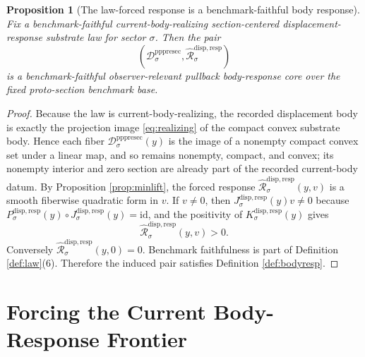 \documentclass[11pt]{article}
\newcommand{\PrePreProtoSectionResidualBody}[1]{\mathcal D_{#1}^{\mathrm{pppresec}}}
\newcommand{\SubstrateProjection}[1]{P_{#1}^{\mathrm{disp,resp}}}
\newcommand{\SubstrateOperator}[1]{K_{#1}^{\mathrm{disp,resp}}}
\newcommand{\SubstrateLift}[1]{J_{#1}^{\mathrm{disp,resp}}}
\newcommand{\ForcedBodyResponse}[1]{\widehat{\mathscr R}_{#1}^{\mathrm{disp,resp}}}
\newtheorem{proposition}{Proposition}
\begin{document}
\begin{proposition}[The law-forced response is a benchmark-faithful body response]
\label{prop:response}
Fix a benchmark-faithful current-body-realizing section-centered displacement-response substrate law for sector \(\sigma\). Then the pair
\[
\left(
\PrePreProtoSectionResidualBody{\sigma},
\ForcedBodyResponse{\sigma}
\right)
\]
is a benchmark-faithful observer-relevant pullback body-response core over the fixed proto-section benchmark base.
\end{proposition}

\begin{proof}
Because the law is current-body-realizing, the recorded displacement body is exactly the projection image \eqref{eq:realizing} of the compact convex substrate body. Hence each fiber \(\PrePreProtoSectionResidualBody{\sigma}(y)\) is the image of a nonempty compact convex set under a linear map, and so remains nonempty, compact, and convex; its nonempty interior and zero section are already part of the recorded current-body datum. By Proposition \ref{prop:minlift}, the forced response \(\ForcedBodyResponse{\sigma}(y,v)\) is a smooth fiberwise quadratic form in \(v\). If \(v\neq 0\), then \(\SubstrateLift{\sigma}(y)v\neq 0\) because \(\SubstrateProjection{\sigma}(y)\circ\SubstrateLift{\sigma}(y)=\mathrm{id}\), and the positivity of \(\SubstrateOperator{\sigma}(y)\) gives
\[
\ForcedBodyResponse{\sigma}(y,v)>0.
\]
Conversely \(\ForcedBodyResponse{\sigma}(y,0)=0\). Benchmark faithfulness is part of Definition \ref{def:law}(6). Therefore the induced pair satisfies Definition \ref{def:bodyresp}.
\end{proof}

\section{Forcing the Current Body-Response Frontier}
\end{document}
